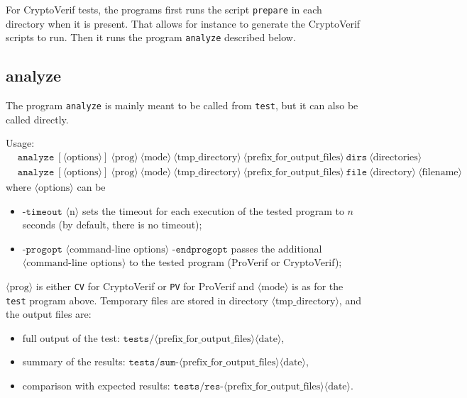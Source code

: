 \documentclass{article}
\newcommand{\nonterm}[1]{\langle\textrm{#1}\rangle}
\begin{document}
For CryptoVerif tests, the programs first runs the script {\tt prepare}
in each directory when it is present. That allows for instance to
generate the CryptoVerif scripts to run.
Then it runs the program {\tt analyze} described below.

\subsection{\ttfamily analyze}

The program {\tt analyze} is mainly meant to be called from {\tt test},
but it can also be called directly.

Usage: 
\begin{align*}
&\texttt{analyze}\ [\nonterm{options}]\ \nonterm{prog}\ \nonterm{mode}\ \nonterm{tmp\_directory}\ \nonterm{prefix\_for\_output\_files}\ \texttt{dirs}\ \nonterm{directories}\\
&\texttt{analyze}\ [\nonterm{options}]\ \nonterm{prog}\ \nonterm{mode}\ \nonterm{tmp\_directory}\ \nonterm{prefix\_for\_output\_files}\ \texttt{file}\ \nonterm{directory}\ \nonterm{filename}
\end{align*}
where $\nonterm{options}$ can be
\begin{itemize}
\item $\texttt{-timeout }\nonterm{n}$ sets the timeout for each execution of the tested
program to $n$ seconds (by default, there is no timeout);
\item $\texttt{-progopt }\nonterm{command-line\ options}\texttt{ -endprogopt}$ passes the
additional $\nonterm{command-line\ options}$ to the tested program (ProVerif or CryptoVerif);
\end{itemize}
$\nonterm{prog}$ is either \texttt{CV} for CryptoVerif or
\texttt{PV} for ProVerif and $\nonterm{mode}$ is as for the
\texttt{test} program above.
Temporary files are stored in directory $\nonterm{tmp\_directory}$,
and the output files are:
\begin{itemize}
\item full output of the test: $\texttt{tests/}\nonterm{prefix\_for\_output\_files}\nonterm{date}$,
\item summary of the results: $\texttt{tests/sum-}\nonterm{prefix\_for\_output\_files}\nonterm{date}$,
\item comparison with expected results: $\texttt{tests/res-}\nonterm{prefix\_for\_output\_files}\nonterm{date}$.
\end{itemize}
\end{document}
